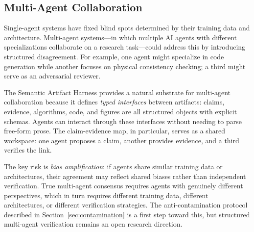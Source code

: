 \documentclass{article}
\begin{document}
\subsection{Multi-Agent Collaboration}

Single-agent systems have fixed blind spots determined by their training data and architecture. Multi-agent systems---in which multiple AI agents with different specializations collaborate on a research task---could address this by introducing structured disagreement. For example, one agent might specialize in code generation while another focuses on physical consistency checking; a third might serve as an adversarial reviewer.

The Semantic Artifact Harness provides a natural substrate for multi-agent collaboration because it defines \emph{typed interfaces} between artifacts: claims, evidence, algorithms, code, and figures are all structured objects with explicit schemas. Agents can interact through these interfaces without needing to parse free-form prose. The claim-evidence map, in particular, serves as a shared workspace: one agent proposes a claim, another provides evidence, and a third verifies the link.

The key risk is \emph{bias amplification}: if agents share similar training data or architectures, their agreement may reflect shared biases rather than independent verification. True multi-agent consensus requires agents with genuinely different perspectives, which in turn requires different training data, different architectures, or different verification strategies. The anti-contamination protocol described in Section~\ref{sec:contamination} is a first step toward this, but structured multi-agent verification remains an open research direction.



\end{document}
